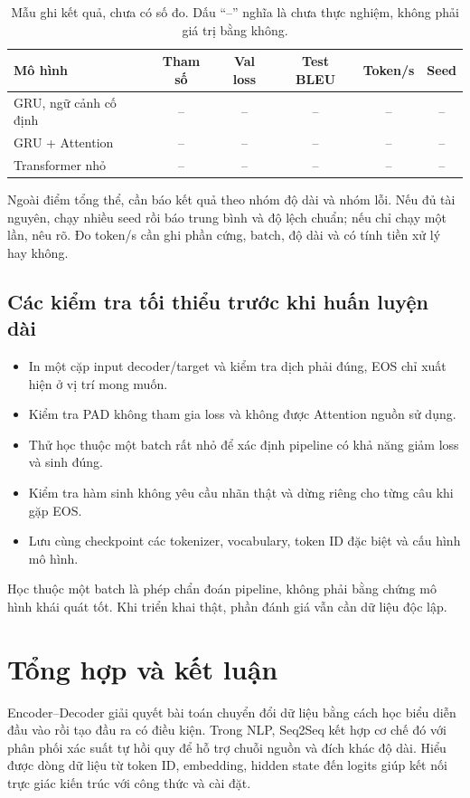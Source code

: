 \documentclass[11pt,a4paper]{article}
\numberwithin{equation}{section}
\begin{document}
\begin{table}[H]
\centering\small
\begin{tabularx}{\linewidth}{@{}Yccccc@{}}
\toprule{}Mô hình & Tham số & Val loss & Test BLEU & Token/s & Seed\\\midrule
GRU, ngữ cảnh cố định & -- & -- & -- & -- & --\\
GRU + Attention & -- & -- & -- & -- & --\\
Transformer nhỏ & -- & -- & -- & -- & --\\
\bottomrule
\end{tabularx}
\caption{Mẫu ghi kết quả, chưa có số đo. Dấu ``--'' nghĩa là chưa thực nghiệm, không phải giá trị bằng không.}
\end{table}
Ngoài điểm tổng thể, cần báo kết quả theo nhóm độ dài và nhóm lỗi. Nếu đủ tài nguyên, chạy nhiều seed rồi báo trung bình và độ lệch chuẩn; nếu chỉ chạy một lần, nêu rõ. Đo token/s cần ghi phần cứng, batch, độ dài và có tính tiền xử lý hay không.

\subsection{Các kiểm tra tối thiểu trước khi huấn luyện dài}
\begin{itemize}
\item In một cặp input decoder/target và kiểm tra dịch phải đúng, EOS chỉ xuất hiện ở vị trí mong muốn.
\item Kiểm tra PAD không tham gia loss và không được Attention nguồn sử dụng.
\item Thử học thuộc một batch rất nhỏ để xác định pipeline có khả năng giảm loss và sinh đúng.
\item Kiểm tra hàm sinh không yêu cầu nhãn thật và dừng riêng cho từng câu khi gặp EOS.
\item Lưu cùng checkpoint các tokenizer, vocabulary, token ID đặc biệt và cấu hình mô hình.
\end{itemize}
Học thuộc một batch là phép chẩn đoán pipeline, không phải bằng chứng mô hình khái quát tốt. Khi triển khai thật, phần đánh giá vẫn cần dữ liệu độc lập.

\section{Tổng hợp và kết luận}
Encoder--Decoder giải quyết bài toán chuyển đổi dữ liệu bằng cách học biểu diễn đầu vào rồi tạo đầu ra có điều kiện. Trong NLP, Seq2Seq kết hợp cơ chế đó với phân phối xác suất tự hồi quy để hỗ trợ chuỗi nguồn và đích khác độ dài. Hiểu được dòng dữ liệu từ token ID, embedding, hidden state đến logits giúp kết nối trực giác kiến trúc với công thức và cài đặt.
\end{document}
